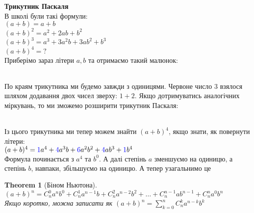 \documentclass[a4paper, 14pt]{article}
\theoremstyle{theoremdd}
\newtheorem{theorem}{Theorem}[subsection]
\theoremstyle{theoremdd}
\theoremstyle{theoremdd}
\theoremstyle{theoremdd}
\theoremstyle{theoremdd}
\theoremstyle{theoremdd}
\theoremstyle{theoremdd}
\theoremstyle{theoremdd}
\begin{document}
	\textbf{Трикутник Паскаля}\\
	В школі були такі формули:\\
	$(a+b) = a + b$\\
	$(a+b)^2 = a^2+2ab + b^2$\\
	$(a+b)^3 = a^3 + 3a^2b + 3ab^2 + b^3$\\
	$(a+b)^4 = ?$\\
	Приберімо зараз літери $a,b$ та отримаємо такий малюнок:\\
	\\
	По краям трикутника ми будемо завжди з одиницями. Червоне число $3$ взялося шляхом додавання двох чисел зверху: $1 + 2$. Якщо дотримуватись аналогічних міркувань, то ми зможемо розширити трикутник Паскаля:\\
	\\
	Із цього трикутника ми тепер можем знайти $(a+b)^4$, якщо знати, як повернути літери:\\
	$(a+b)^4 = \textcolor{blue}{1} a^4 + \textcolor{blue}{4}a^3 b + \textcolor{blue}{6} a^2  b^2 + \textcolor{blue}{4}a b^3 + \textcolor{blue}{1} b^4$\\
	Формула починається з $a^4$ та $b^0$. А далі степінь $a$ зменшуємо на одиницю, а степінь $b$, навпаки, збільшуємо на одиницю. А тепер узагальнимо це
	\begin{theorem}[Біном Ньютона]
	$(a+b)^n = C_n^0 a^n b^0 + C_n^1 a^{n-1}b + C_n^2 a^{n-2}b^2 + \dots + C_n^{n-1} a b^{n-1} + C_n^n a^0 b^n$\\
	Якщо коротко, можна записати як $(a+b)^n = \displaystyle \sum_{k=0}^n C_n^k a^{n-k} b^k$
	\end{theorem}
	
\end{document}
